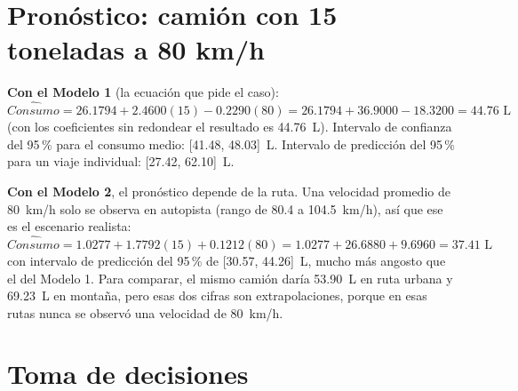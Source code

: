 \documentclass[12pt,letterpaper]{article}
\begin{document}
\section{Pronóstico: camión con 15 toneladas a 80 km/h}

\textbf{Con el Modelo 1} (la ecuación que pide el caso):
$$ \widehat{Consumo} = 26.1794 + 2.4600(15) - 0.2290(80) = 26.1794 + 36.9000 - 18.3200 = \boxed{44.76 \text{ L}} $$
(con los coeficientes sin redondear el resultado es 44.76~L). Intervalo de confianza del 95\,\% para el consumo medio: [41.48, 48.03]~L. Intervalo de predicción del 95\,\% para un viaje individual: [27.42, 62.10]~L.

\textbf{Con el Modelo 2}, el pronóstico depende de la ruta. Una velocidad promedio de 80~km/h solo se observa en autopista (rango de 80.4 a 104.5~km/h), así que ese es el escenario realista:
$$ \widehat{Consumo} = 1.0277 + 1.7792(15) + 0.1212(80) = 1.0277 + 26.6880 + 9.6960 = \boxed{37.41 \text{ L}} $$
con intervalo de predicción del 95\,\% de [30.57, 44.26]~L, mucho más angosto que el del Modelo 1. Para comparar, el mismo camión daría 53.90~L en ruta urbana y 69.23~L en montaña, pero esas dos cifras son extrapolaciones, porque en esas rutas nunca se observó una velocidad de 80~km/h.

\section{Toma de decisiones}
\end{document}
